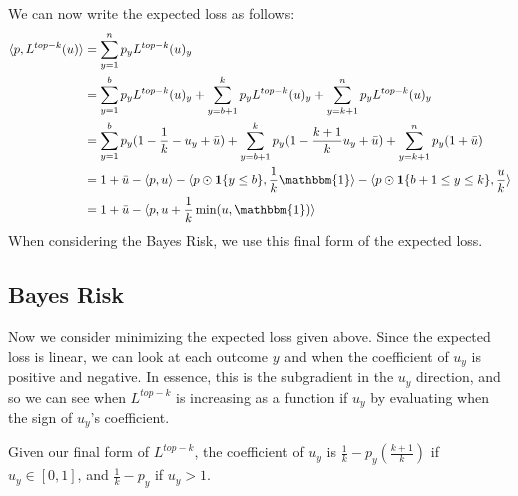 \documentclass[12pt]{article}
\newcommand{\ubar}{\bar{u}}
\newcommand{\inprod}[2]{\langle #1, #2 \rangle}%
\newcommand{\ones}{\mathbbm{1}}
\newcommand{\Ind}[1]{\mathbf{1}\{#1\}}
\begin{document}
We can now write the expected loss as follows:
\begin{align*}
\inprod{p}{L^{top-k}(u)} &= \sum_{y=1}^n p_y L^{top-k}(u)_y \\
&= \sum_{y=1}^b p_y L^{top-k}(u)_y + \sum_{y=b+1}^k p_y L^{top-k}(u)_y + \sum_{y=k+1}^n p_y L^{top-k}(u)_y\\
&= \sum_{y=1}^b p_y (1 - \frac 1 k - u_y + \ubar) + \sum_{y=b+1}^k p_y (1 - \frac{k+1} k u_y + \ubar) + \sum_{y=k+1}^n p_y(1 + \ubar)\\
&= 1 + \ubar - \inprod{p}{u} - \inprod{p \odot \Ind{y \leq b}}{\frac 1 k \ones} - \inprod{p \odot \Ind{b+1 \leq y \leq k}}{ \frac u k}\\
&= 1 + \ubar - \inprod{p}{u + \frac 1 k \min(u, \ones)}
\end{align*}
When considering the Bayes Risk, we use this final form of the expected loss.

\subsection{Bayes Risk}
Now we consider minimizing the expected loss given above.
Since the expected loss is linear, we can look at each outcome $y$ and when the coefficient of $u_y$ is positive and negative.
In essence, this is the subgradient in the $u_y$ direction, and so we can see when $L^{top-k}$ is increasing as a function if $u_y$ by evaluating when the sign of $u_y$'s coefficient.

Given our final form of $L^{top-k}$, the coefficient of $u_y$ is $\frac 1 k - p_y(\frac {k+1}{k})$ if $u_y \in [0,1]$, and $\frac 1 k - p_y$ if $u_y > 1$.
\end{document}
